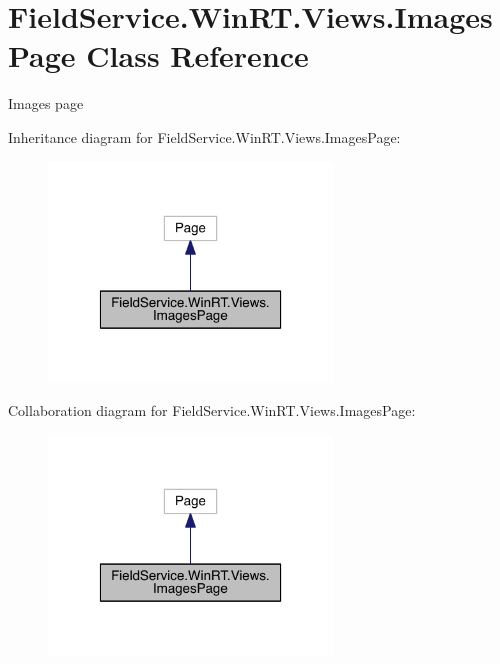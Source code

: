 \hypertarget{class_field_service_1_1_win_r_t_1_1_views_1_1_images_page}{\section{Field\+Service.\+Win\+R\+T.\+Views.\+Images\+Page Class Reference}
\label{class_field_service_1_1_win_r_t_1_1_views_1_1_images_page}
}


Images page  




Inheritance diagram for Field\+Service.\+Win\+R\+T.\+Views.\+Images\+Page\+:
\nopagebreak
\begin{figure}[H]
\begin{center}
\leavevmode
\includegraphics[width=214pt]{class_field_service_1_1_win_r_t_1_1_views_1_1_images_page__inherit__graph}
\end{center}
\end{figure}


Collaboration diagram for Field\+Service.\+Win\+R\+T.\+Views.\+Images\+Page\+:
\nopagebreak
\begin{figure}[H]
\begin{center}
\leavevmode
\includegraphics[width=214pt]{class_field_service_1_1_win_r_t_1_1_views_1_1_images_page__coll__graph}
\end{center}
\end{figure}
